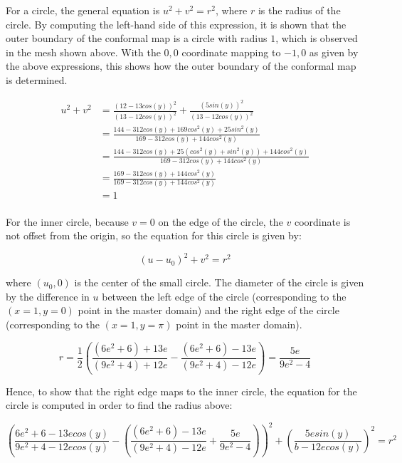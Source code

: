 \documentclass[10pt]{article}
\begin{document}
For a circle, the general equation is \(u^2+v^2=r^2\), where \(r\) is the radius of the circle. By computing the left-hand side of this expression, it is shown that the outer boundary of the conformal map is a circle with radius \(1\), which is observed in the mesh shown above. With the \(0,0\) coordinate mapping to \(-1,0\) as given by the above expressions, this shows how the outer boundary of the conformal map is determined.

\begin{equation}
\begin{aligned}
u^2+v^2& =\frac{(12-13cos(y))^2}{(13-12cos(y))^2}+\frac{(5sin(y))^2}{(13-12cos(y))^2}\\
& =\frac{144-312cos(y)+169cos^2(y)+25sin^2(y)}{169-312cos(y)+144cos^2(y)}\\
& =\frac{144-312cos(y)+25(cos^2(y)+sin^2(y))+144cos^2(y)}{169-312cos(y)+144cos^2(y)}\\
& =\frac{169-312cos(y)+144cos^2(y)}{169-312cos(y)+144cos^2(y)}\\
& = 1\\
\end{aligned}
\end{equation}

For the inner circle, because \(v=0\) on the edge of the circle, the \(v\) coordinate is not offset from the origin, so the equation for this circle is given by:

\begin{equation}
(u-u_0)^2+v^2=r^2
\end{equation}

where \((u_0,0)\) is the center of the small circle. The diameter of the circle is given by the difference in \(u\) between the left edge of the circle (corresponding to the \((x=1,y=0)\) point in the master domain) and the right edge of the circle (corresponding to the \((x=1,y=\pi)\) point in the master domain). 

\begin{equation}
\label{eq:radius}
r=\frac{1}{2}\left(\frac{(6e^{2}+6)+13e}{(9e^{2}+4)+12e}-\frac{(6e^{2}+6)-13e}{(9e^{2}+4)-12e}\right)=\frac{5e}{9e^2-4}
\end{equation}

Hence, to show that the right edge maps to the inner circle, the equation for the circle is computed in order to find the radius above:

\begin{equation}
\left(\frac{6e^{2}+6-13ecos(y)}{9e^{2}+4-12ecos(y)}-\left(\frac{(6e^{2}+6)-13e}{(9e^{2}+4)-12e}+\frac{5e}{9e^2-4}\right)\right)^2+\left(\frac{5esin(y)}{b-12ecos(y)}\right)^2=r^2
\end{equation}
\end{document}
